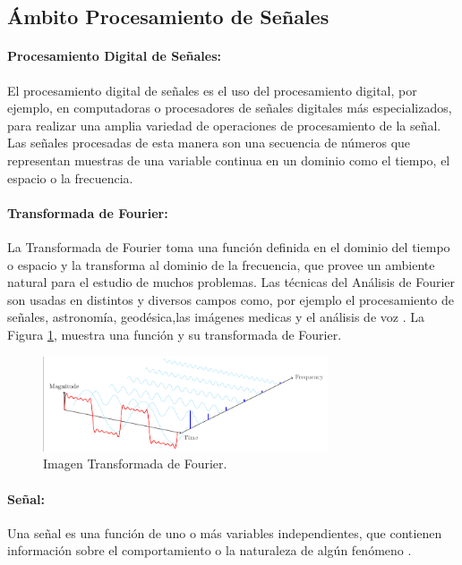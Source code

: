 \subsection{Ámbito Procesamiento de Señales}

\paragraph{Procesamiento Digital de Señales:}
El procesamiento digital de señales es el uso del procesamiento digital, por ejemplo, en computadoras o procesadores de señales digitales más especializados, para realizar una amplia variedad de operaciones de procesamiento de la señal.
Las señales procesadas de esta manera son una secuencia de números que representan muestras de una variable continua en un dominio como el tiempo, el espacio o la frecuencia.

\paragraph{Transformada de Fourier:}
La Transformada de Fourier toma una función definida en el dominio del tiempo o espacio y la transforma al dominio de la frecuencia, que provee un ambiente natural para el estudio de muchos problemas.
Las técnicas del Análisis de Fourier son usadas en distintos y diversos campos como, por ejemplo el procesamiento de señales, astronomía, geodésica,las imágenes medicas y el análisis de voz
\cite{neilsalkind2006}.
La Figura \ref{fig:tf}, muestra una función y su transformada de Fourier.

\begin{figure}[H]
    \centering
    \includegraphics[width=0.75\textwidth]{imagenes/image17.png}
    \caption{Imagen Transformada de Fourier.}
    \label{fig:tf}
\end{figure}


\paragraph{Señal:}
Una señal es una función de uno o más variables independientes, que contienen información sobre el comportamiento o la naturaleza de algún fenómeno
\cite{alanoppenheim2015}.


